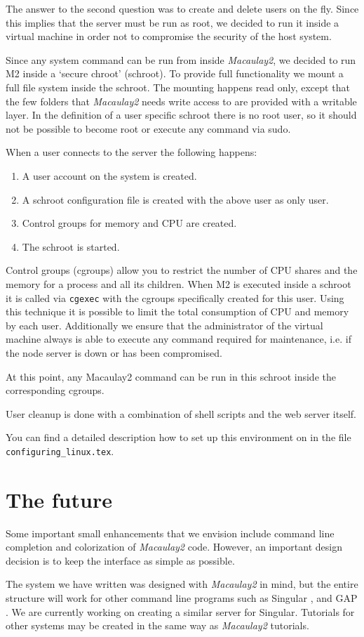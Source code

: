 \documentclass[]{article}
\def\M2{{\it Macaulay2}}
\begin{document}
The answer to the second question was to create and delete users on
the fly. Since this implies that the server must be run as root, we
decided to run it inside a virtual machine in order not to compromise
the security of the host system.

Since any system command can be run from inside \M2, we
decided to run M2 inside a `secure chroot' (schroot). To provide full
functionality we mount a full file system inside the schroot. The mounting
happens read only, except that the few folders that \M2 needs write access to are provided with a writable layer.
In the definition of a user specific
schroot there is no root user, so it should not be possible to become
root or execute any command via sudo.

When a user connects to the server the following happens:
\begin{enumerate}
\item A user account on the system is created.
\item A schroot configuration file is created with the above user as only user.
\item Control groups for memory and CPU are created.
\item The schroot is started.
\end{enumerate}

Control groups (cgroups) allow you to restrict the number of CPU
shares and the memory for a process and all its children. When M2 is
executed inside a schroot it is called via {\tt cgexec} with the
cgroups specifically created for this user. Using this technique it is
possible to limit the total consumption of CPU and memory by each
user. Additionally we ensure that the administrator of the virtual
machine always is able to execute any command required for
maintenance, i.e. if the node server is down or has been compromised.

At this point, any Macaulay2 command can be run in this schroot inside the
corresponding cgroups.

User cleanup is done with a combination of shell scripts and the web server itself.

You can find a detailed description how to set up this environment on
\cite{trym2-github} in the file {\tt configuring\_linux.tex}.

\section{The future}

Some important small enhancements that we envision include command
line completion and colorization of \M2 code.  However, an important
design decision is to keep the interface as simple as possible.

The system we have written was designed with \M2 in mind, but 
the entire structure will work for other command line programs such as Singular \cite{},
and GAP \cite{}.  We are currently working on creating a similar server for Singular.
Tutorials for other systems may be created in the same way as \M2 tutorials.



\end{document}
